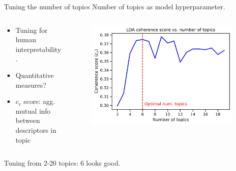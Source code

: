 \documentclass{beamer}
\begin{document}
	\begin{frame}{Tuning the number of topics}
		Number of topics as model hyperparameter. 
	\begin{columns}
		\begin{column}{0.4\textwidth}
\begin{itemize}
	\item Tuning for human interpretability.
	\item Quantitative measures? 
	\item $c_v$ score: agg. mutual info between descriptors in topic
\end{itemize}

		\end{column}
		\begin{column}{0.6\textwidth}
			\begin{figure}[H]
				\begin{center}
					\includegraphics[scale = 0.5]{LDA_coherence}
				\end{center}
			\end{figure}
		\end{column}
		
		
	\end{columns}
Tuning from 2-20 topics: 6 looks good. 
\end{frame}
\end{document}
